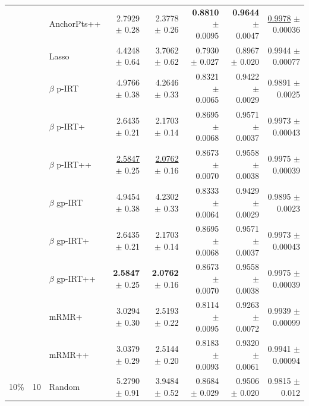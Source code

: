 \begin{longtable}{llp{}rrrrr}
 &  & AnchorPts++ & 2.7929 {\scriptsize $\pm$ 0.28} & 2.3778 {\scriptsize $\pm$ 0.26} & \textbf{0.8810} {\scriptsize $\pm$ 0.0095} & \textbf{0.9644} {\scriptsize $\pm$ 0.0047} & \underline{0.9978} {\scriptsize $\pm$ 0.00036} \\
 &  & Lasso & 4.4248 {\scriptsize $\pm$ 0.64} & 3.7062 {\scriptsize $\pm$ 0.62} & 0.7930 {\scriptsize $\pm$ 0.027} & 0.8967 {\scriptsize $\pm$ 0.020} & 0.9944 {\scriptsize $\pm$ 0.00077} \\
 &  & $\beta$ p-IRT & 4.9766 {\scriptsize $\pm$ 0.38} & 4.2646 {\scriptsize $\pm$ 0.33} & 0.8321 {\scriptsize $\pm$ 0.0065} & 0.9422 {\scriptsize $\pm$ 0.0029} & 0.9891 {\scriptsize $\pm$ 0.0025} \\
 &  & $\beta$ p-IRT+ & 2.6435 {\scriptsize $\pm$ 0.21} & 2.1703 {\scriptsize $\pm$ 0.14} & 0.8695 {\scriptsize $\pm$ 0.0068} & 0.9571 {\scriptsize $\pm$ 0.0037} & 0.9973 {\scriptsize $\pm$ 0.00043} \\
 &  & $\beta$ p-IRT++ & \underline{2.5847} {\scriptsize $\pm$ 0.25} & \underline{2.0762} {\scriptsize $\pm$ 0.16} & 0.8673 {\scriptsize $\pm$ 0.0070} & 0.9558 {\scriptsize $\pm$ 0.0038} & 0.9975 {\scriptsize $\pm$ 0.00039} \\
 &  & $\beta$ gp-IRT & 4.9454 {\scriptsize $\pm$ 0.38} & 4.2302 {\scriptsize $\pm$ 0.33} & 0.8333 {\scriptsize $\pm$ 0.0064} & 0.9429 {\scriptsize $\pm$ 0.0029} & 0.9895 {\scriptsize $\pm$ 0.0023} \\
 &  & $\beta$ gp-IRT+ & 2.6435 {\scriptsize $\pm$ 0.21} & 2.1703 {\scriptsize $\pm$ 0.14} & 0.8695 {\scriptsize $\pm$ 0.0068} & 0.9571 {\scriptsize $\pm$ 0.0037} & 0.9973 {\scriptsize $\pm$ 0.00043} \\
 &  & $\beta$ gp-IRT++ & \textbf{2.5847} {\scriptsize $\pm$ 0.25} & \textbf{2.0762} {\scriptsize $\pm$ 0.16} & 0.8673 {\scriptsize $\pm$ 0.0070} & 0.9558 {\scriptsize $\pm$ 0.0038} & 0.9975 {\scriptsize $\pm$ 0.00039} \\
 &  & mRMR+ & 3.0294 {\scriptsize $\pm$ 0.30} & 2.5193 {\scriptsize $\pm$ 0.22} & 0.8114 {\scriptsize $\pm$ 0.0095} & 0.9263 {\scriptsize $\pm$ 0.0072} & 0.9939 {\scriptsize $\pm$ 0.00099} \\
 &  & mRMR++ & 3.0379 {\scriptsize $\pm$ 0.29} & 2.5144 {\scriptsize $\pm$ 0.20} & 0.8183 {\scriptsize $\pm$ 0.0093} & 0.9320 {\scriptsize $\pm$ 0.0061} & 0.9941 {\scriptsize $\pm$ 0.00094} \\
\midrule
10\% & 10 & Random & 5.2790 {\scriptsize $\pm$ 0.91} & 3.9484 {\scriptsize $\pm$ 0.52} & 0.8684 {\scriptsize $\pm$ 0.029} & 0.9506 {\scriptsize $\pm$ 0.020} & 0.9815 {\scriptsize $\pm$ 0.012} \\

\end{longtable}
